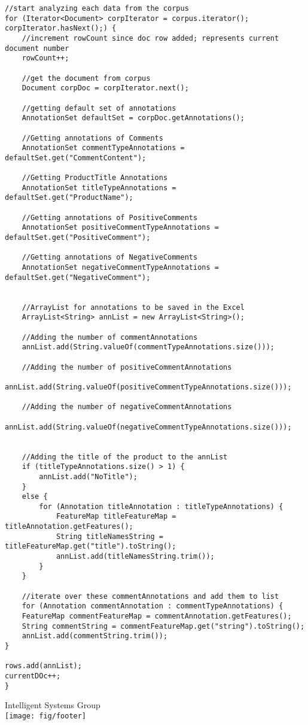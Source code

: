 \documentclass[a4paper,12pt]{report}
\begin{document}
\begin{lstlisting}
//start analyzing each data from the corpus			
for (Iterator<Document> corpIterator = corpus.iterator(); corpIterator.hasNext();) {	
	//increment rowCount since doc row added; represents current document number
	rowCount++;
	
	//get the document from corpus
	Document corpDoc = corpIterator.next();
					
	//getting default set of annotations
	AnnotationSet defaultSet = corpDoc.getAnnotations();
					
	//Getting annotations of Comments
	AnnotationSet commentTypeAnnotations = defaultSet.get("CommentContent");
					
	//Getting ProductTitle Annotations
	AnnotationSet titleTypeAnnotations = defaultSet.get("ProductName");
					
	//Getting annotations of PositiveComments
	AnnotationSet positiveCommentTypeAnnotations = defaultSet.get("PositiveComment");

	//Getting annotations of NegativeComments
	AnnotationSet negativeCommentTypeAnnotations = defaultSet.get("NegativeComment");

					
	//ArrayList for annotations to be saved in the Excel
	ArrayList<String> annList = new ArrayList<String>();
					
	//Adding the number of commentAnnotations
	annList.add(String.valueOf(commentTypeAnnotations.size()));
					
	//Adding the number of positiveCommentAnnotations
	annList.add(String.valueOf(positiveCommentTypeAnnotations.size()));

	//Adding the number of negativeCommentAnnotations
	annList.add(String.valueOf(negativeCommentTypeAnnotations.size()));

					
	//Adding the title of the product to the annList
	if (titleTypeAnnotations.size() > 1) {
		annList.add("NoTitle");
	}
	else {
		for (Annotation titleAnnotation : titleTypeAnnotations) {
			FeatureMap titleFeatureMap = titleAnnotation.getFeatures();
			String titleNamesString = titleFeatureMap.get("title").toString();
			annList.add(titleNamesString.trim());
		}
	}
					
	//iterate over these commentAnnotations and add them to list
	for (Annotation commentAnnotation : commentTypeAnnotations) {
	FeatureMap commentFeatureMap = commentAnnotation.getFeatures();
	String commentString = commentFeatureMap.get("string").toString();
	annList.add(commentString.trim());
}

rows.add(annList);
currentDOc++;
}

\end{lstlisting}

 
%


\mbox{}
\nocite{*}





\vspace{2cm}
\begin{center}
Intelligent Systems Group\\
\texttt{[image: fig/footer]}
\end{center}
\end{document}
